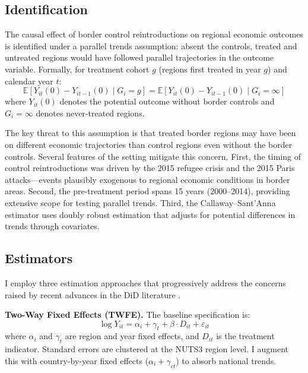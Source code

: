 \documentclass[12pt]{article}
\newcommand{\E}{\mathbb{E}}
\begin{document}
\subsection{Identification}

The causal effect of border control reintroductions on regional economic outcomes is identified under a parallel trends assumption: absent the controls, treated and untreated regions would have followed parallel trajectories in the outcome variable. Formally, for treatment cohort $g$ (regions first treated in year $g$) and calendar year $t$:
\begin{equation}
\E[Y_{it}(0) - Y_{it-1}(0) \mid G_i = g] = \E[Y_{it}(0) - Y_{it-1}(0) \mid G_i = \infty]
\end{equation}
where $Y_{it}(0)$ denotes the potential outcome without border controls and $G_i = \infty$ denotes never-treated regions.

The key threat to this assumption is that treated border regions may have been on different economic trajectories than control regions even without the border controls. Several features of the setting mitigate this concern. First, the timing of control reintroductions was driven by the 2015 refugee crisis and the 2015 Paris attacks---events plausibly exogenous to regional economic conditions in border areas. Second, the pre-treatment period spans 15 years (2000--2014), providing extensive scope for testing parallel trends. Third, the Callaway--Sant'Anna estimator uses doubly robust estimation that adjusts for potential differences in trends through covariates.

\subsection{Estimators}

I employ three estimation approaches that progressively address the concerns raised by recent advances in the DiD literature \citep{deCF2020, GoodmanBacon2021, BJS2021, Roth2023}.

\textbf{Two-Way Fixed Effects (TWFE).} The baseline specification is:
\begin{equation}
\log Y_{it} = \alpha_i + \gamma_t + \beta \cdot D_{it} + \varepsilon_{it}
\label{eq:twfe}
\end{equation}
where $\alpha_i$ and $\gamma_t$ are region and year fixed effects, and $D_{it}$ is the treatment indicator. Standard errors are clustered at the NUTS3 region level. I augment this with country-by-year fixed effects ($\alpha_i + \gamma_{ct}$) to absorb national trends.
\end{document}
